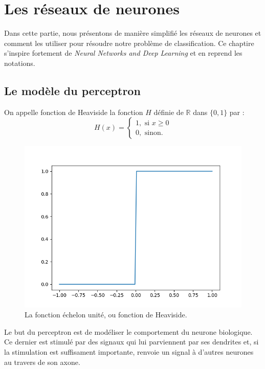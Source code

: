 
\chapter{Les réseaux de neurones}

Dans cette partie, nous présentons de manière simplifié les réseaux de neurones 
et comment les utiliser pour résoudre notre problème de classification.
Ce chaptire s'inspire fortement de \textit{Neural Networks and Deep Learning}\cite{neuralnetworksanddeeplearning} 
et en reprend les notations.


\section{Le modèle du perceptron}



\begin{definition}
On appelle fonction de Heaviside la fonction $H$ définie de $\mathbb{R}$ dans $\{0, 1\}$ par :
\[
H(x) = 
\begin{cases}
 1, \text{ si } x \geq 0 \\
 0, \text{ sinon.} 
 \end{cases}
\]
\end{definition}

\begin{figure}[h]
  \centering
  \includegraphics[scale=0.5]{assets/heaviside}
  \caption{La fonction échelon unité, ou fonction de Heaviside.}
  \label{fig:heaviside}
\end{figure}

Le but du perceptron est de modéliser le comportement du neurone biologique. 
Ce dernier est stimulé par des signaux qui lui parviennent par ses dendrites et, si 
la stimulation est suffisament importante, renvoie un signal à d'autres neurones au travers de son axone.

